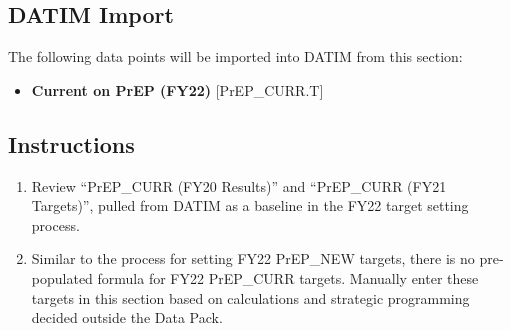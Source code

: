 \documentclass[
  openany]{book}
\providecommand{\tightlist}{%
  \setlength{\itemsep}{0pt}\setlength{\parskip}{0pt}}
\begin{document}
\begin{table}[H]
\centering\begingroup\fontsize{12}{14}\selectfont

\endgroup{}
\end{table}

\hypertarget{datim-import-42}{%
\subsection{DATIM Import}\label{datim-import-42}}

The following data points will be imported into DATIM from this section:

\begin{itemize}
\tightlist
\item
  \textbf{Current on PrEP (FY22)} {[}PrEP\_CURR.T{]}
\end{itemize}

\hypertarget{instructions-42}{%
\subsection{Instructions}\label{instructions-42}}

\begin{enumerate}
\def\labelenumi{\arabic{enumi}.}
\item
  Review ``PrEP\_CURR (FY20 Results)'' and ``PrEP\_CURR (FY21 Targets)'',
  pulled from DATIM as a baseline in the FY22 target setting process.
\item
  Similar to the process for setting FY22 PrEP\_NEW targets, there is
  no pre-populated formula for FY22 PrEP\_CURR targets. Manually enter
  these targets in this section based on calculations and strategic
  programming decided outside the Data Pack.
\end{enumerate}
\end{document}
